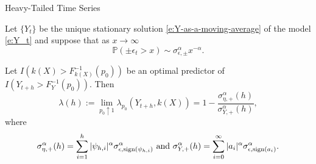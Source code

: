 \documentclass{beamer}
\newtheorem{remark}{Remark}[section]
\def\P{\mathbb P}
\def\sign{{\rm sign}}
\begin{document}

\begin{frame}{Heavy-Tailed Time Series}
    \begin{theorem}\label{thm:AR(p)-extreme-precision}
        Let $\{Y_t\}$ be the unique stationary solution \eqref{e:Y-as-a-moving-average} of the model \eqref{e:Y_t} and suppose that as $x \to \infty$
        \[
        \P(\pm \epsilon_t > x) \sim \sigma_{\epsilon, \pm}^\alpha x^{-\alpha}.
        \]
        
        Let $I(k(X) > F_{k(X)}^{-1}(p_0))$ be an optimal predictor of $I(Y_{t + h} > F_Y^{-1}(p_0))$. Then
        \[
        \lambda(h):= \lim_{p_0 \uparrow 1} \lambda_{p_0}(Y_{t+h}, k(X)) = 1 - \frac{\sigma_{\eta, +}^{\alpha}(h)}{\sigma_{Y, +}^{\alpha}(h)},
        \]
        where
        \[
        \sigma_{\eta, +}^{\alpha}(h) = \sum_{i = 1}^h |\psi_{h, i}|^{\alpha}\sigma_{\epsilon, \sign(\psi_{h, i})}^{\alpha} \text{ and } \sigma_{Y, +}^{\alpha}(h) = \sum_{i = 0}^{\infty} |a_i|^{\alpha}\sigma_{\epsilon, \sign(a_i)}^{\alpha}.
        \]
    \end{theorem}
\end{frame}

\end{document}
